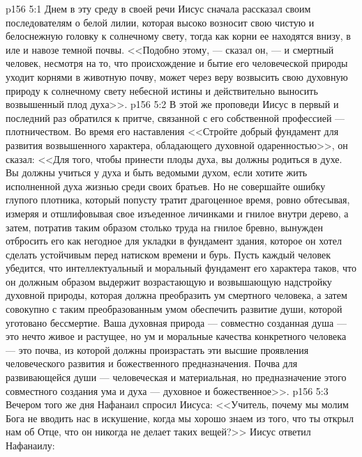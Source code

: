\vs p156 5:1 Днем в эту среду в своей речи Иисус сначала рассказал своим последователям о белой лилии, которая высоко возносит свою чистую и белоснежную головку к солнечному свету, тогда как корни ее находятся внизу, в иле и навозе темной почвы. <<Подобно этому, --- сказал он, --- и смертный человек, несмотря на то, что происхождение и бытие его человеческой природы уходит корнями в животную почву, может через веру возвысить свою духовную природу к солнечному свету небесной истины и действительно выносить возвышенный плод духа>>.
\vs p156 5:2 В этой же проповеди Иисус в первый и последний раз обратился к притче, связанной с его собственной профессией --- плотничеством. Во время его наставления <<Стройте добрый фундамент для развития возвышенного характера, обладающего духовной одаренностью>>, он сказал: <<Для того, чтобы принести плоды духа, вы должны родиться в духе. Вы должны учиться у духа и быть ведомыми духом, если хотите жить исполненной духа жизнью среди своих братьев. Но не совершайте ошибку глупого плотника, который попусту тратит драгоценное время, ровно обтесывая, измеряя и отшлифовывая свое изъеденное личинками и гнилое внутри дерево, а затем, потратив таким образом столько труда на гнилое бревно, вынужден отбросить его как негодное для укладки в фундамент здания, которое он хотел сделать устойчивым перед натиском времени и бурь. Пусть каждый человек убедится, что интеллектуальный и моральный фундамент его характера таков, что он должным образом выдержит возрастающую и возвышающую надстройку духовной природы, которая должна преобразить ум смертного человека, а затем совокупно с таким преобразованным умом обеспечить развитие души, которой уготовано бессмертие. Ваша духовная природа --- совместно созданная душа --- это нечто живое и растущее, но ум и моральные качества конкретного человека --- это почва, из которой должны произрастать эти высшие проявления человеческого развития и божественного предназначения. Почва для развивающейся души --- человеческая и материальная, но предназначение этого совместного создания ума и духа --- духовное и божественное>>.
\vs p156 5:3 Вечером того же дня Нафанаил спросил Иисуса: <<Учитель, почему мы молим Бога не вводить нас в искушение, когда мы хорошо знаем из того, что ты открыл нам об Отце, что он никогда не делает таких вещей?>> Иисус ответил Нафанаилу:
